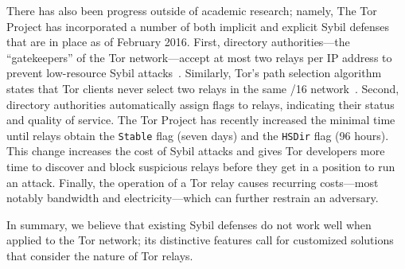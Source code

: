 There has also been progress outside of academic research; namely, The Tor
Project has incorporated a number of both implicit and explicit Sybil defenses
that are in place as of February 2016.  First, directory authorities---the
``gatekeepers'' of the Tor network---accept at most two relays per IP address to
prevent low-resource Sybil attacks~\cite{Bauer2007a,Bauer2007b}.  Similarly,
Tor's path selection algorithm states that Tor clients never select two relays
in the same /16 network~\cite{path-spec}.  Second, directory authorities
automatically assign flags to relays, indicating their status and quality of
service.  The Tor Project has recently increased the minimal time until relays
obtain the \texttt{Stable} flag (seven days) and the \texttt{HSDir} flag (96
hours).  This change increases the cost of Sybil attacks and gives Tor
developers more time to discover and block suspicious relays before they get in
a position to run an attack.  Finally, the operation of a Tor relay causes
recurring costs---most notably bandwidth and electricity---which can further
restrain an adversary.

In summary, we believe that existing Sybil defenses do not work well when
applied to the Tor network; its distinctive features call for customized
solutions that consider the nature of Tor relays.
